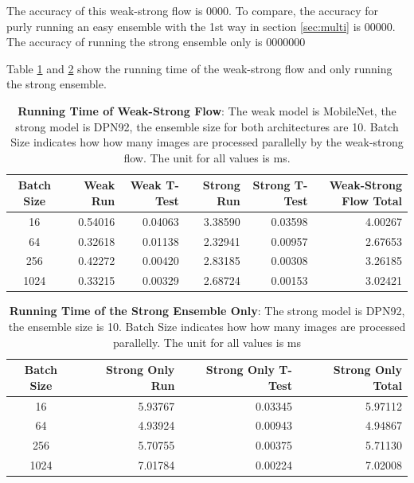 \documentclass{article}
\begin{document}
The accuracy of this weak-strong flow is 0000. To compare, the accuracy for purly running an easy ensemble with the 1st way in section \ref{sec:multi} is 00000. The accuracy of running the strong ensemble only is 0000000

Table \ref{WSFlow} and \ref{strong_only} show the running time of the weak-strong flow and only running the strong ensemble.


\begin{table}
    \centering
    \begin{tabular}{crrrrr}
        \toprule
        {} Batch Size &  Weak Run &  Weak T-Test &  Strong Run &  Strong T-Test &  Weak-Strong Flow Total \\
        \midrule
        16         &   0.54016 &      0.04063 &     3.38590 &        0.03598 &                 4.00267 \\
        64         &   0.32618 &      0.01138 &     2.32941 &        0.00957 &                 2.67653 \\
        256        &   0.42272 &      0.00420 &     2.83185 &        0.00308 &                 3.26185 \\
        1024       &   0.33215 &      0.00329 &     2.68724 &        0.00153 &                 3.02421 \\
        \bottomrule
    \end{tabular}
\label{WSFlow}
\caption{\textbf{Running Time of Weak-Strong Flow}: The weak model is MobileNet, the strong model is DPN92, the ensemble size for both architectures are 10. Batch Size indicates how how many images are processed parallelly by the weak-strong flow. The unit for all values is ms.}
\end{table}

\begin{table}
    \centering
    \begin{tabular}{crrr}
        \toprule
        {} Batch Size &  Strong Only Run &  Strong Only T-Test &  Strong Only Total \\
        \midrule
        16         &          5.93767 &             0.03345 &            5.97112 \\
        64         &          4.93924 &             0.00943 &            4.94867 \\
        256        &          5.70755 &             0.00375 &            5.71130 \\
        1024       &          7.01784 &             0.00224 &            7.02008 \\
        \bottomrule
        \end{tabular}
\label{strong_only}
\caption{\textbf{Running Time of the Strong Ensemble Only}: The strong model is DPN92, the ensemble size is 10. Batch Size indicates how how many images are processed parallelly. The unit for all values is ms}
\end{table}



\end{document}
